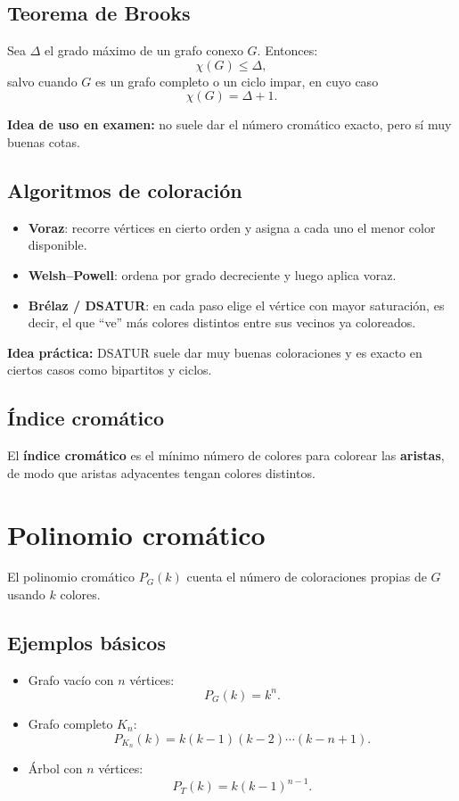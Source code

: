 \documentclass[11pt,a4paper]{article}
\begin{document}
\subsection{Teorema de Brooks}
Sea $\Delta$ el grado máximo de un grafo conexo $G$. Entonces:
\[
\chi(G)\le \Delta,
\]
salvo cuando $G$ es un grafo completo o un ciclo impar, en cuyo caso
\[
\chi(G)=\Delta+1.
\]

\textbf{Idea de uso en examen:} no suele dar el número cromático exacto, pero sí muy buenas cotas.

\subsection{Algoritmos de coloración}
\begin{itemize}
    \item \textbf{Voraz}: recorre vértices en cierto orden y asigna a cada uno el menor color disponible.
    \item \textbf{Welsh--Powell}: ordena por grado decreciente y luego aplica voraz.
    \item \textbf{Brélaz / DSATUR}: en cada paso elige el vértice con mayor saturación, es decir, el que ``ve'' más colores distintos entre sus vecinos ya coloreados.
\end{itemize}

\textbf{Idea práctica:} DSATUR suele dar muy buenas coloraciones y es exacto en ciertos casos como bipartitos y ciclos.

\subsection{Índice cromático}
El \textbf{índice cromático} es el mínimo número de colores para colorear las \textbf{aristas}, de modo que aristas adyacentes tengan colores distintos.

\section{Polinomio cromático}

El polinomio cromático $P_G(k)$ cuenta el número de coloraciones propias de $G$ usando $k$ colores.

\subsection{Ejemplos básicos}
\begin{itemize}
    \item Grafo vacío con $n$ vértices:
    \[
    P_G(k)=k^n.
    \]
    \item Grafo completo $K_n$:
    \[
    P_{K_n}(k)=k(k-1)(k-2)\cdots (k-n+1).
    \]
    \item Árbol con $n$ vértices:
    \[
    P_T(k)=k(k-1)^{n-1}.
    \]
\end{itemize}
\end{document}
